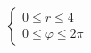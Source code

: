 \documentclass[preview]{standalone}
\begin{document}
\begin{align*}
\left\{ \begin{array}{l}0 \leq r \leq 4 \\0 \leq \varphi \leq 2 \pi\end{array} \right.
\end{align*}
\end{document}
